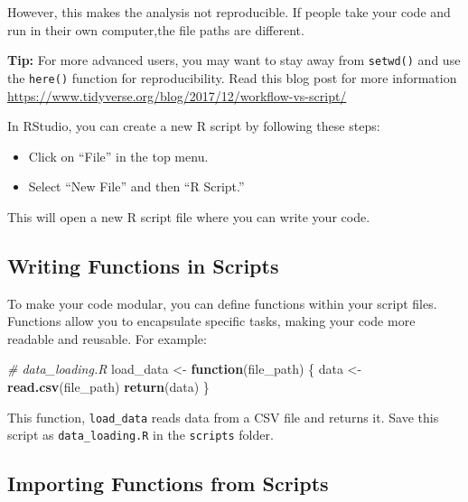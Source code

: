 \documentclass[
]{book}
\newenvironment{Shaded}{\begin{snugshade}}{\end{snugshade}}
\newcommand{\CommentTok}[1]{\textcolor[rgb]{0.56,0.35,0.01}{\textit{#1}}}
\newcommand{\ControlFlowTok}[1]{\textcolor[rgb]{0.13,0.29,0.53}{\textbf{#1}}}
\newcommand{\FunctionTok}[1]{\textcolor[rgb]{0.13,0.29,0.53}{\textbf{#1}}}
\newcommand{\NormalTok}[1]{#1}
\newcommand{\OtherTok}[1]{\textcolor[rgb]{0.56,0.35,0.01}{#1}}
\begin{document}
However, this makes the analysis not reproducible. If people take your code and run in their own computer,the file paths are different.

\textbf{Tip:} For more advanced users, you may want to stay away from \texttt{setwd()} and use the \texttt{here()} function for reproducibility. Read this blog post for more information \url{https://www.tidyverse.org/blog/2017/12/workflow-vs-script/}

In RStudio, you can create a new R script by following these steps:

\begin{itemize}
\item
  Click on ``File'' in the top menu.
\item
  Select ``New File'' and then ``R Script.''
\end{itemize}

This will open a new R script file where you can write your code.

\hypertarget{writing-functions-in-scripts}{%
\subsection{Writing Functions in Scripts}\label{writing-functions-in-scripts}}

To make your code modular, you can define functions within your script files. Functions allow you to encapsulate specific tasks, making your code more readable and reusable. For example:

\begin{Shaded}
\begin{Highlighting}[]
\CommentTok{\# data\_loading.R}
\NormalTok{load\_data }\OtherTok{\textless{}{-}} \ControlFlowTok{function}\NormalTok{(file\_path) \{}
\NormalTok{  data }\OtherTok{\textless{}{-}} \FunctionTok{read.csv}\NormalTok{(file\_path)}
  \FunctionTok{return}\NormalTok{(data)}
\NormalTok{\}}
\end{Highlighting}
\end{Shaded}

This function, \texttt{load\_data} reads data from a CSV file and returns it. Save this script as \texttt{data\_loading.R} in the \texttt{scripts} folder.

\hypertarget{importing-functions-from-scripts}{%
\subsection{Importing Functions from Scripts}\label{importing-functions-from-scripts}}
\end{document}
